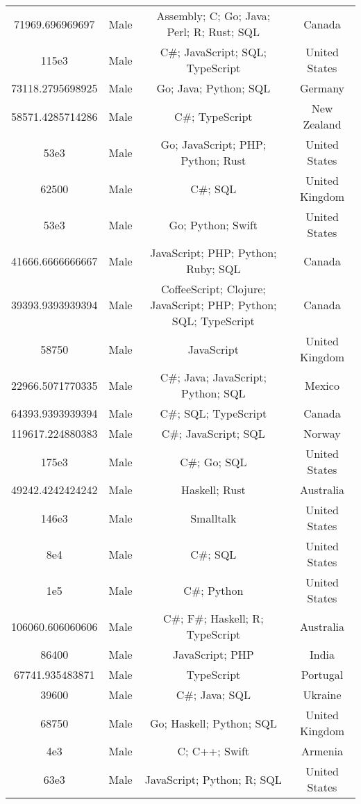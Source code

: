 \begin{center}
\begin{tabular}{ |c|c|c|c| }
71969.696969697  &  Male  &  Assembly; C; Go; Java; Perl; R; Rust; SQL  &  Canada  \\ 
115e3  &  Male  &  C\#; JavaScript; SQL; TypeScript  &  United States  \\ 
73118.2795698925  &  Male  &  Go; Java; Python; SQL  &  Germany  \\ 
58571.4285714286  &  Male  &  C\#; TypeScript  &  New Zealand  \\ 
53e3  &  Male  &  Go; JavaScript; PHP; Python; Rust  &  United States  \\ 
62500  &  Male  &  C\#; SQL  &  United Kingdom  \\ 
53e3  &  Male  &  Go; Python; Swift  &  United States  \\ 
41666.6666666667  &  Male  &  JavaScript; PHP; Python; Ruby; SQL  &  Canada  \\ 
39393.9393939394  &  Male  &  CoffeeScript; Clojure; JavaScript; PHP; Python; SQL; TypeScript  &  Canada  \\ 
58750  &  Male  &  JavaScript  &  United Kingdom  \\ 
22966.5071770335  &  Male  &  C\#; Java; JavaScript; Python; SQL  &  Mexico  \\ 
64393.9393939394  &  Male  &  C\#; SQL; TypeScript  &  Canada  \\ 
119617.224880383  &  Male  &  C\#; JavaScript; SQL  &  Norway  \\ 
175e3  &  Male  &  C\#; Go; SQL  &  United States  \\ 
49242.4242424242  &  Male  &  Haskell; Rust  &  Australia  \\ 
146e3  &  Male  &  Smalltalk  &  United States  \\ 
8e4  &  Male  &  C\#; SQL  &  United States  \\ 
1e5  &  Male  &  C\#; Python  &  United States  \\ 
106060.606060606  &  Male  &  C\#; F\#; Haskell; R; TypeScript  &  Australia  \\ 
86400  &  Male  &  JavaScript; PHP  &  India  \\ 
67741.935483871  &  Male  &  TypeScript  &  Portugal  \\ 
39600  &  Male  &  C\#; Java; SQL  &  Ukraine  \\ 
68750  &  Male  &  Go; Haskell; Python; SQL  &  United Kingdom  \\ 
4e3  &  Male  &  C; C++; Swift  &  Armenia  \\ 
63e3  &  Male  &  JavaScript; Python; R; SQL  &  United States  \\ 

\end{tabular}
\end{center}
